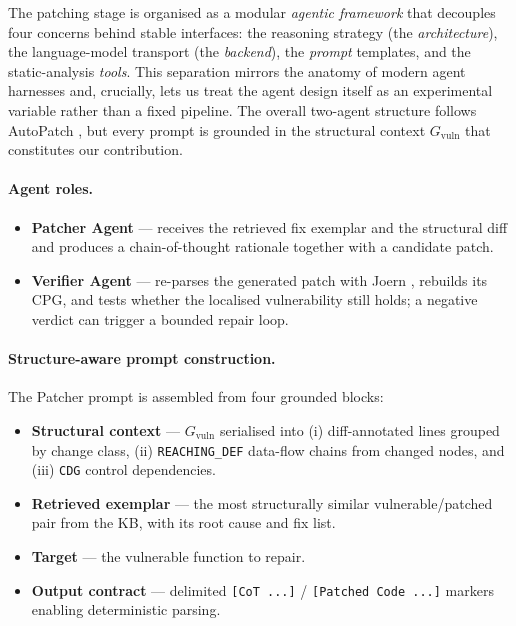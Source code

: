 \documentclass[11pt, a4paper]{article}
\begin{document}
The patching stage is organised as a modular \emph{agentic framework} that
decouples four concerns behind stable interfaces: the reasoning strategy (the
\emph{architecture}), the language-model transport (the \emph{backend}), the
\emph{prompt} templates, and the static-analysis \emph{tools}. This separation
mirrors the anatomy of modern agent harnesses \cite{langchain_agent_harness} and,
crucially, lets us treat the agent design itself as an experimental variable
rather than a fixed pipeline. The overall two-agent structure follows
AutoPatch \cite{Seo2025AutoPatchMF}, but every prompt is grounded in the
structural context $G_{\mathrm{vuln}}$ that constitutes our contribution.

\paragraph{Agent roles.}
\begin{itemize}[leftmargin=*, nosep]
  \item \textbf{Patcher Agent} --- receives the retrieved fix exemplar and the
    structural diff and produces a chain-of-thought rationale together with a
    candidate patch.
  \item \textbf{Verifier Agent} --- re-parses the generated patch with Joern
    \cite{joern}, rebuilds its CPG, and tests whether the localised
    vulnerability still holds; a negative verdict can trigger a bounded repair
    loop.
\end{itemize}

\paragraph{Structure-aware prompt construction.} The Patcher prompt is assembled
from four grounded blocks:
\begin{itemize}[leftmargin=*, nosep]
  \item \textbf{Structural context} --- $G_{\mathrm{vuln}}$ serialised into
    (i) diff-annotated lines grouped by change class, (ii) \texttt{REACHING\_DEF}
    data-flow chains from changed nodes, and (iii) \texttt{CDG} control
    dependencies.
  \item \textbf{Retrieved exemplar} --- the most structurally similar
    vulnerable/patched pair from the KB, with its root cause and fix list.
  \item \textbf{Target} --- the vulnerable function to repair.
  \item \textbf{Output contract} --- delimited \verb|[CoT ...]| /
    \verb|[Patched Code ...]| markers enabling deterministic parsing.
\end{itemize}
\end{document}

